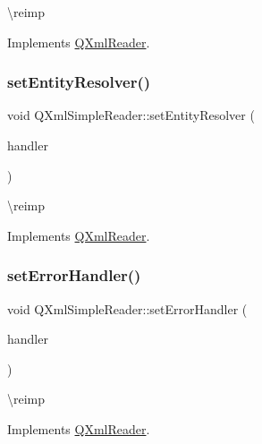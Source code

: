 \textbackslash{}reimp 

Implements \mbox{\hyperlink{class_q_xml_reader_a0b24b1fe26a4c32a8032d68ee14d5dba}{Q\+Xml\+Reader}}.

\mbox{\label{class_q_xml_simple_reader_a48dc90b8bdb4e1a0f8474079443f71b0}} 
\subsubsection{\texorpdfstring{setEntityResolver()}{setEntityResolver()}}
{\footnotesize\ttfamily void Q\+Xml\+Simple\+Reader\+::set\+Entity\+Resolver (\begin{DoxyParamCaption}\item[{\mbox{\hyperlink{class_q_xml_entity_resolver}{Q\+Xml\+Entity\+Resolver}} $\ast$}]{handler }\end{DoxyParamCaption})\hspace{0.3cm}{\ttfamily [virtual]}}

\textbackslash{}reimp 

Implements \mbox{\hyperlink{class_q_xml_reader_a82a810f10ac48cf35d698f57bc2d4647}{Q\+Xml\+Reader}}.

\mbox{\label{class_q_xml_simple_reader_a2c660f128d0820723138e4e0af5b9dcb}} 
\subsubsection{\texorpdfstring{setErrorHandler()}{setErrorHandler()}}
{\footnotesize\ttfamily void Q\+Xml\+Simple\+Reader\+::set\+Error\+Handler (\begin{DoxyParamCaption}\item[{\mbox{\hyperlink{class_q_xml_error_handler}{Q\+Xml\+Error\+Handler}} $\ast$}]{handler }\end{DoxyParamCaption})\hspace{0.3cm}{\ttfamily [virtual]}}

\textbackslash{}reimp 

Implements \mbox{\hyperlink{class_q_xml_reader_a97cab92522d1ceb8f6da94a161a72ee2}{Q\+Xml\+Reader}}.


